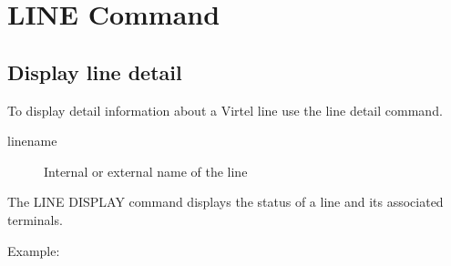 \documentclass[letterpaper,10pt,english]{sphinxmanual}
\begin{document}

\section{LINE Command}
\label{\detokenize{audit_operations_ and_performance:index-5}}\label{\detokenize{audit_operations_ and_performance:line-command}}

\subsection{Display line detail}
\label{\detokenize{audit_operations_ and_performance:display-line-detail}}
To display detail information about a Virtel line use the line detail command.

\begin{sphinxVerbatim}[commandchars=\\\{\}]
  
\end{sphinxVerbatim}
\begin{description}
\item[{linename}] \leavevmode
Internal or external name of the line

\end{description}

The LINE DISPLAY command displays the status of a line and its associated terminals.

Example:
\end{document}
